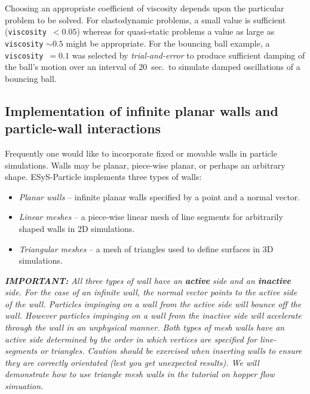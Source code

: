Choosing an appropriate coefficient of viscosity depends upon the particular problem to be solved. For elastodynamic problems, a small value is sufficient (\texttt{viscosity}~$< 0.05$) whereas for quasi-static problems a value as large as \texttt{viscosity} $\sim 0.5$ might be appropriate. For the bouncing ball example, a \texttt{viscosity}~$= 0.1$ was selected by \emph{trial-and-error} to produce sufficient damping of the ball's motion over an interval of $20$~sec.\ to simulate damped oscillations of a bouncing ball. 

\subsection{Implementation of infinite planar walls and particle-wall interactions}

Frequently one would like to incorporate fixed or movable walls in particle simulations. Walls may be planar, piece-wise planar, or perhaps an arbitrary shape. ESyS-Particle implements three types of walls:

\begin{itemize}
\item \emph{Planar walls} -- infinite planar walls specified by a point and a normal vector. 
\item \emph{Linear meshes} -- a piece-wise linear mesh of line segments for arbitrarily shaped walls in 2D simulations.
\item \emph{Triangular meshes} -- a mesh of triangles used to define surfaces in 3D simulations.
\end{itemize}

\vskip 5mm
\begin{minipage}{5.75in}
\emph{\textbf{IMPORTANT:} All three types of wall have an \textbf{active} side and an \textbf{inactive} side. For the case of an infinite wall, the normal vector points to the active side of the wall. Particles impinging on a wall from the active side will bounce off the wall. However particles impinging on a wall from the inactive side will accelerate through the wall in an unphysical manner. Both types of mesh walls have an active side determined by the order in which vertices are specified for line-segments or triangles. Caution should be exercised when inserting walls to ensure they are correctly orientated (lest you get unexpected results). We will demonstrate how to use triangle mesh walls in the tutorial on hopper flow simuation.}
\end{minipage}
\vskip 5mm

